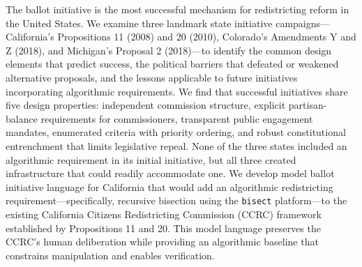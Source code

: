 The ballot initiative is the most successful mechanism for redistricting reform in the United States. We examine three landmark state initiative campaigns---California's Propositions 11 (2008) and 20 (2010), Colorado's Amendments Y and Z (2018), and Michigan's Proposal 2 (2018)---to identify the common design elements that predict success, the political barriers that defeated or weakened alternative proposals, and the lessons applicable to future initiatives incorporating algorithmic requirements. We find that successful initiatives share five design properties: independent commission structure, explicit partisan-balance requirements for commissioners, transparent public engagement mandates, enumerated criteria with priority ordering, and robust constitutional entrenchment that limits legislative repeal. None of the three states included an algorithmic requirement in its initial initiative, but all three created infrastructure that could readily accommodate one. We develop model ballot initiative language for California that would add an algorithmic redistricting requirement---specifically, recursive bisection using the \texttt{bisect} platform---to the existing California Citizens Redistricting Commission (CCRC) framework established by Propositions 11 and 20. This model language preserves the CCRC's human deliberation while providing an algorithmic baseline that constrains manipulation and enables verification.
